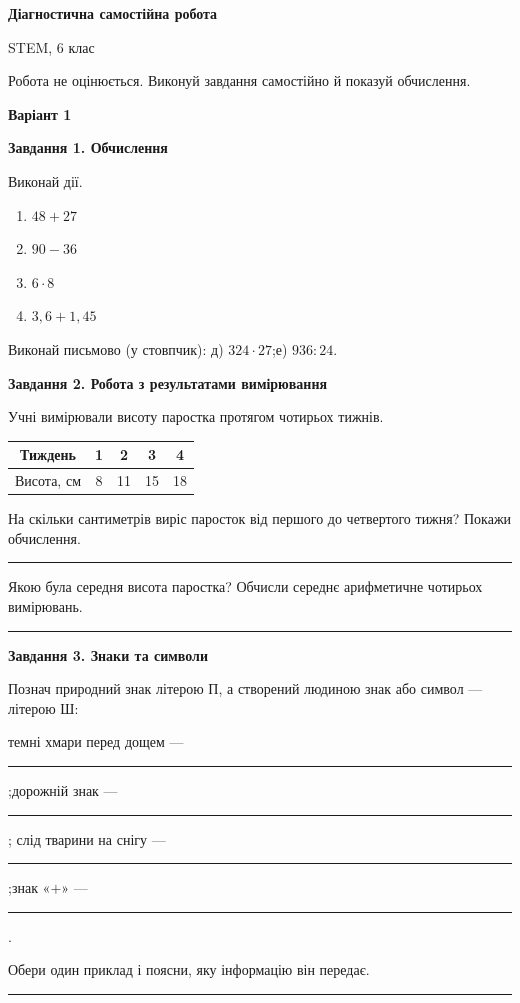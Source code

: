 \documentclass[10pt,a4paper]{article}
\newcommand{\answerline}[1]{\par\vspace{2pt}\rule{#1}{0.4pt}}
\begin{document}
\begin{center}
  {\Large\bfseries Діагностична самостійна робота}\par
  {\large STEM, 6 клас}\par
  \small Робота не оцінюється. Виконуй завдання самостійно й показуй обчислення.
\end{center}

\begin{center}
  {\large\bfseries Варіант 1}
\end{center}

\textbf{Завдання 1. Обчислення}

Виконай дії.
\begin{enumerate}[label=\alph*)]
  \item $48+27$
  \item $90-36$
  \item $6\cdot 8$
  \item $3{,}6+1{,}45$
\end{enumerate}

Виконай письмово (у стовпчик): д) $324\cdot27$;\quad е) $936:24$.

\textbf{Завдання 2. Робота з результатами вимірювання}

Учні вимірювали висоту паростка протягом чотирьох тижнів.

\begin{center}
\begin{tabular}{|c|c|c|c|c|}
\hline
Тиждень & 1 & 2 & 3 & 4 \\
\hline
Висота, см & 8 & 11 & 15 & 18 \\
\hline
\end{tabular}
\end{center}

На скільки сантиметрів виріс паросток від першого до четвертого тижня? Покажи обчислення.
\answerline{\linewidth}

Якою була середня висота паростка? Обчисли середнє арифметичне чотирьох вимірювань.
\answerline{\linewidth}

\textbf{Завдання 3. Знаки та символи}

Познач природний знак літерою П, а створений людиною знак або символ --- літерою Ш:

темні хмари перед дощем --- \rule{0.8cm}{0.4pt};\quad дорожній знак --- \rule{0.8cm}{0.4pt};\quad
слід тварини на снігу --- \rule{0.8cm}{0.4pt};\quad знак «$+$» --- \rule{0.8cm}{0.4pt}.

Обери один приклад і поясни, яку інформацію він передає.
\answerline{\linewidth}
\end{document}
